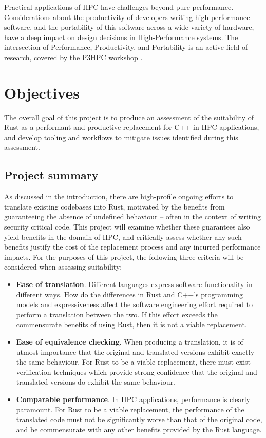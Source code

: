 Practical applications of \acrshort{HPC} have challenges beyond pure performance. Considerations about the productivity of developers writing high performance software, and the portability of this software across a wide variety of hardware, have a deep impact on design decisions in High-Performance systems. The intersection of Performance, Productivity, and Portability is an active field of research, covered by the P3HPC workshop \cite{P3HPC}.



\section{Objectives}
\label{sec:objectives}

The overall goal of this project is to produce an assessment of the suitability of Rust as a performant and productive replacement for C++ in \acrshort{HPC} applications, and develop tooling and workflows to mitigate issues identified during this assessment.

\subsection{Project summary}
\label{ssec:objectives-summary}

As discussed in the \hyperref[ch:introduction]{introduction}, there are high-profile ongoing efforts to translate existing codebases into Rust, motivated by the benefits from guaranteeing the absence of undefined behaviour -- often in the context of writing security critical code. This project will examine whether these guarantees also yield benefits in the domain of \acrshort{HPC}, and critically assess whether any such benefits justify the cost of the replacement process and any incurred performance impacts. For the purposes of this project, the following three criteria will be considered when assessing suitability:

\begin{itemize}
    \item \textbf{Ease of translation}. Different languages express software functionality in different ways. How do the differences in Rust and C++'s programming models and expressiveness affect the software engineering effort required to perform a translation between the two. If this effort exceeds the commensurate benefits of using Rust, then it is not a viable replacement.
    \item \textbf{Ease of equivalence checking}. When producing a translation, it is of utmost importance that the original and translated versions exhibit exactly the same behaviour. For Rust to be a viable replacement, there must exist verification techniques which provide strong confidence that the original and translated versions do exhibit the same behaviour.
    \item \textbf{Comparable performance}. In \acrshort{HPC} applications, performance is clearly paramount. For Rust to be a viable replacement, the performance of the translated code must not be significantly worse than that of the original code, and be commensurate with any other benefits provided by the Rust language.
\end{itemize}

